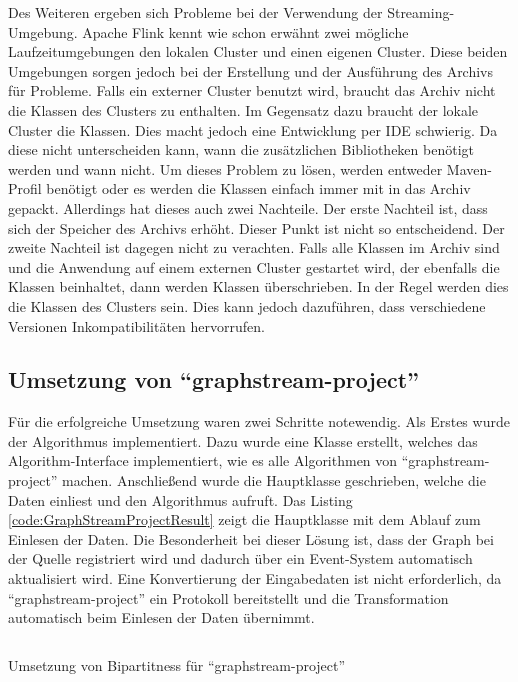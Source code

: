 Des Weiteren ergeben sich Probleme bei der Verwendung der Streaming-Umgebung.
Apache Flink kennt wie schon erwähnt zwei mögliche Laufzeitumgebungen den lokalen
Cluster und einen eigenen Cluster. Diese beiden Umgebungen sorgen jedoch bei
der Erstellung und der Ausführung des Archivs für Probleme. Falls ein externer
Cluster benutzt wird, braucht das Archiv nicht die Klassen des Clusters zu
enthalten. Im Gegensatz dazu braucht der lokale Cluster die Klassen. Dies macht
jedoch eine Entwicklung per \gls{IDE} schwierig. Da diese nicht unterscheiden
kann, wann die zusätzlichen Bibliotheken benötigt werden und wann nicht. Um
dieses Problem zu lösen, werden entweder Maven-Profil benötigt oder es werden
die Klassen einfach immer mit in das Archiv gepackt. Allerdings hat dieses auch
zwei Nachteile. Der erste Nachteil ist, dass sich der Speicher des Archivs
erhöht. Dieser Punkt ist nicht so entscheidend. Der zweite Nachteil ist dagegen
nicht zu verachten. Falls alle Klassen im Archiv sind und die Anwendung auf
einem externen Cluster gestartet wird, der ebenfalls die Klassen beinhaltet,
dann werden Klassen überschrieben. In der Regel werden dies die Klassen des
Clusters sein. Dies kann jedoch dazuführen, dass verschiedene Versionen
Inkompatibilitäten hervorrufen.

\subsection{Umsetzung von \enquote{graphstream-project}}
Für die erfolgreiche Umsetzung waren zwei Schritte notewendig. Als Erstes wurde
der Algorithmus implementiert. Dazu wurde eine Klasse erstellt, welches das
Algorithm-Interface implementiert, wie es alle Algorithmen von
\enquote{graphstream-project} machen. Anschließend wurde die Hauptklasse
geschrieben, welche die Daten einliest und den Algorithmus aufruft.
Das Listing \ref{code:GraphStreamProjectResult} zeigt die Hauptklasse mit dem
Ablauf zum Einlesen der Daten. Die Besonderheit bei dieser Lösung ist, dass
der Graph bei der Quelle registriert wird und dadurch über ein Event-System
automatisch aktualisiert wird. Eine Konvertierung der Eingabedaten ist nicht
erforderlich, da \enquote{graphstream-project} ein Protokoll bereitstellt und
die Transformation automatisch beim Einlesen der Daten übernimmt.

\begin{listing}
    \inputminted[breaklines=true]{java}{../material/code/GraphStreamProjectResult.java}
    \caption{Umsetzung von Bipartitness für \enquote{graphstream-project}}
    \label{code:GraphStreamProjectResult}
\end{listing}

